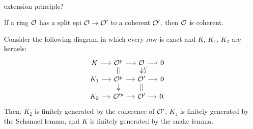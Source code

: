 \documentclass{../../large}
\begin{document}
\begin{prb}\,
\begin{parts}
\item extension principle?
\item If a ring $\mathcal{O}$ has a split epi $\mathcal{O}\to\mathcal{O}'$ to a coherent $\mathcal{O}'$, then $\mathcal{O}$ is coherent.
\end{parts}
\end{prb}
\begin{pf}
Consider the following diagram in which every row is exact and $K$, $K_1$, $K_2$ are kernels:
\[\begin{tikzcd}[sep=small]
K \rar & \cO^p \rar\dar[equals] & \cO \rar\dar[two heads] & 0\\
K_1 \rar & \cO^p \rar\dar[two heads] & \cO' \rar\dar[equals]\uar[hookrightarrow,bend right] & 0\\
K_2 \rar & \cO'^p \rar & \cO' \rar & 0.
\end{tikzcd}\]
Then, $K_2$ is finitely generated by the coherence of $\mathcal{O}'$, $K_1$ is finitely generated by the Schanuel lemma, and $K$ is finitely generated by the snake lemma.
\end{pf}
\end{document}
